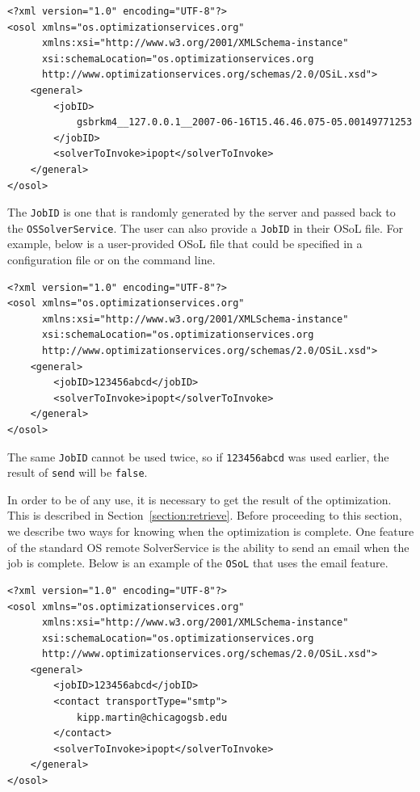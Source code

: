 \documentclass[11pt]{article}
\renewcommand{\_}{{\char"5F}}
\renewcommand{\{}{{\char"7B}}
\renewcommand{\}}{{\char"7D}}
\renewcommand{\^}{{\char"0D}}
\renewcommand{\'}{{\char"0D}}
\begin{document}
\begin{enumerate}[Step 1:]
\begin{verbatim}
<?xml version="1.0" encoding="UTF-8"?>
<osol xmlns="os.optimizationservices.org"
      xmlns:xsi="http://www.w3.org/2001/XMLSchema-instance"
      xsi:schemaLocation="os.optimizationservices.org
      http://www.optimizationservices.org/schemas/2.0/OSiL.xsd">
    <general>
        <jobID>
            gsbrkm4__127.0.0.1__2007-06-16T15.46.46.075-05.00149771253
        </jobID>
        <solverToInvoke>ipopt</solverToInvoke>      
    </general>
</osol>
\end{verbatim}

The {\tt JobID} is one that is randomly generated by the server and passed back to the {\tt OSSolverService}.
The user can also provide a {\tt JobID} in their OSoL file. For example, below is a user-provided OSoL file that could
be specified in a configuration file or on the command line.

\begin{verbatim}
<?xml version="1.0" encoding="UTF-8"?>
<osol xmlns="os.optimizationservices.org"
      xmlns:xsi="http://www.w3.org/2001/XMLSchema-instance"
      xsi:schemaLocation="os.optimizationservices.org
      http://www.optimizationservices.org/schemas/2.0/OSiL.xsd">
    <general>
        <jobID>123456abcd</jobID>
        <solverToInvoke>ipopt</solverToInvoke>      
    </general>
</osol>
\end{verbatim}

The same {\tt JobID} cannot be used twice, so if {\tt 123456abcd} was used earlier, the result of {\tt send} will be
{\tt false}.

In order to be of any use, it is necessary to get the result of the optimization. This is described in
Section~\ref{section:retrieve}. Before proceeding to this section, we describe two ways for knowing when
the optimization is complete. One feature of the standard OS remote SolverService is the ability to send an
email when the job is complete. Below is an example of the {\tt OSoL} that uses the email feature.

\begin{verbatim}
<?xml version="1.0" encoding="UTF-8"?>
<osol xmlns="os.optimizationservices.org"
      xmlns:xsi="http://www.w3.org/2001/XMLSchema-instance"
      xsi:schemaLocation="os.optimizationservices.org
      http://www.optimizationservices.org/schemas/2.0/OSiL.xsd">
    <general>
        <jobID>123456abcd</jobID>
        <contact transportType="smtp">
            kipp.martin@chicagogsb.edu
        </contact>
        <solverToInvoke>ipopt</solverToInvoke>      
    </general>
</osol>
\end{verbatim}


\end{enumerate}
\end{document}

